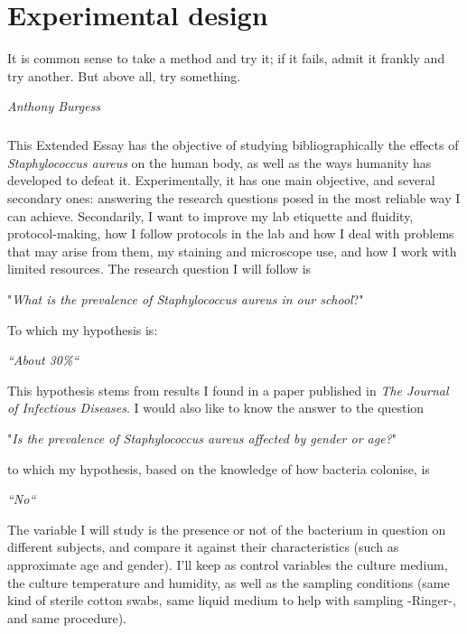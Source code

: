 \chapter{Experimental design}
\epigraph{It is common sense to take a method and try it; if it fails, admit it frankly and try another. But above all, try something.}{\textit{Anthony Burgess}}
\paragraph{}This Extended Essay has the objective of studying bibliographically the effects of \emph{Staphylococcus aureus} on the human body, as well as the ways humanity has developed to defeat it. Experimentally, it has one main objective, and several secondary ones: answering the research questions posed in the most reliable way I can achieve. Secondarily, I want to improve my lab etiquette and fluidity, protocol-making, how I follow protocols in the lab and how I deal with problems that may arise from them, my staining and microscope use,  and how I work with limited resources.\newline 
The research question I will follow is 
\begin{center}"\emph{What is the prevalence of \emph{Staphylococcus aureus} in our school}?"\end{center}
To which my hypothesis is:
\begin{center}\emph{``About 30\%``}\end{center} 
This hypothesis stems from results I found in a paper published in \emph{The Journal of Infectious Diseases}\cite{kuehnertPrevalenceStaphylococcusAureus2006}. I would also like to know the answer to the question
\begin{center}"\emph{Is the prevalence of \emph{Staphylococcus aureus} affected by gender or age?}"\end{center}
to which my hypothesis, based on the knowledge of how bacteria colonise, is 
\begin{center}\emph{``No``}\end{center}
The variable I will study is the presence or not of the bacterium in question on different subjects, and compare it against their characteristics (such as approximate age and gender). I'll keep as control variables the culture medium, the culture temperature and humidity, as well as the sampling conditions (same kind of sterile cotton swabs, same liquid medium to help with sampling -Ringer-, and same procedure).
